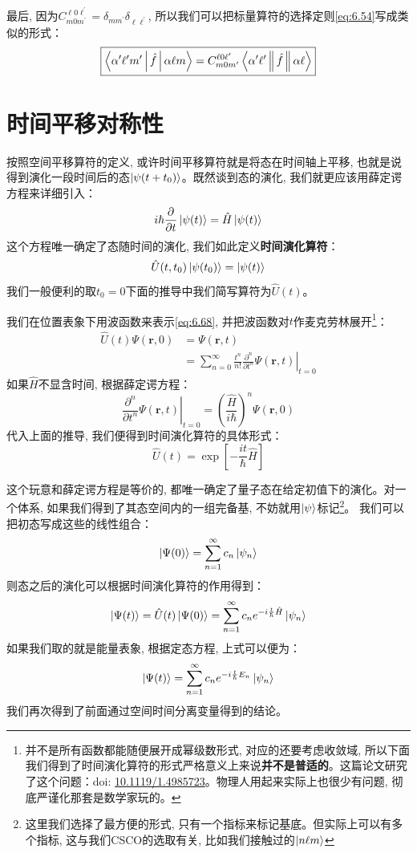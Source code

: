 \documentclass[a4paper,zihao=-4,linespread=1]{ctexrep}
\newcommand{\DOI}[1]{doi: \href{https://doi.org/#1}{#1}} %
\begin{document}
    最后, 因为$C^{\ell 0\ell^\prime}_{m0m^\prime}=\delta_{mm^\prime}\delta_{\ell\ell^\prime}$, 所以我们可以把标量算符的选择定则\ref{eq:6.54}写成类似的形式：
    \begin{equation}
        \boxed{\Braket{\alpha^\prime\ell^\prime m^\prime|\hat{f}|\alpha \ell m}=C^{\ell 0\ell^\prime}_{m0m^\prime}\Braket{\alpha^\prime \ell^\prime \|\hat{f}\|\alpha\ell }}
    \end{equation}

    \section{时间平移对称性}
    按照空间平移算符的定义, 或许时间平移算符就是将态在时间轴上平移, 也就是说得到演化一段时间后的态$\ket{\psi(t+t_0)}$。既然谈到态的演化, 我们就更应该用薛定谔方程来详细引入：
    \[i\hbar\frac{\partial}{\partial t}\ket{\psi(t)}=\hat{H}\ket{\psi(t)}\]
    这个方程唯一确定了态随时间的演化, 我们如此定义\textbf{时间演化算符}：
    \begin{equation}
        \label{eq:6.68}
        \hat{U}(t,t_0)\ket{\psi(t_0)}=\ket{\psi(t)}
    \end{equation}
    我们一般便利的取$t_0=0$下面的推导中我们简写算符为$\hat{U}(t)$。

    我们在位置表象下用波函数来表示\ref{eq:6.68}, 并把波函数对$t$作麦克劳林展开\footnote{并不是所有函数都能随便展开成幂级数形式, 对应的还要考虑收敛域, 所以下面我们得到了时间演化算符的形式严格意义上来说\textbf{并不是普适的}。这篇论文研究了这个问题：\DOI{10.1119/1.4985723}。物理人用起来实际上也很少有问题, 彻底严谨化那套是数学家玩的。}：
    \begin{align*}
        \hat{U}(t)\Psi(\mathbf{r},0)&=\Psi(\mathbf{r},t)\\
        &=\sum_{n=0}^\infty \frac{t^n}{n!}\left.\frac{\partial^{n}}{\partial t^{n}} \Psi(\mathbf{r}, t)\right|_{t=0}
    \end{align*}
    如果$\hat{H}$不显含时间, 根据薛定谔方程：
    \begin{equation}
        \left.\frac{\partial^{n}}{\partial t^{n}} \Psi(\mathbf{r}, t)\right|_{t=0}=\left(\frac{\hat{H}}{i\hbar}\right)^n\Psi(\mathbf{r},0)
    \end{equation}
    代入上面的推导, 我们便得到时间演化算符的具体形式：
    \begin{equation}
        \label{eq:6.70}
        \boxed{\hat{U}(t)=\exp \left[-\frac{i t}{\hbar} \hat{H}\right]}
    \end{equation}
    
    这个玩意和薛定谔方程是等价的, 都唯一确定了量子态在给定初值下的演化。对一个体系, 如果我们得到了其态空间内的一组完备基, 不妨就用$\ket{\psi}$标记\footnote{这里我们选择了最方便的形式, 只有一个指标来标记基底。但实际上可以有多个指标, 这与我们CSCO的选取有关, 比如我们接触过的$\ket{n\ell m}$}。
    我们可以把初态写成这些的线性组合：
    \[\ket{\Psi(0)}=\sum_{n=1}^{\infty}c_n\ket{\psi_n}\]
    则态之后的演化可以根据时间演化算符的作用得到：
    \[\ket{\Psi(t)}=\hat{U}(t)\ket{\Psi(0)}=\sum_{n=1}^{\infty}c_ne^{-i\frac{t}{\hbar}\hat{H}}\ket{\psi_n}\]
    如果我们取的就是能量表象, 根据定态方程, 上式可以便为：
    \[\ket{\Psi(t)}=\sum_{n=1}^{\infty}c_ne^{-i\frac{t}{\hbar}E_n}\ket{\psi_n}\]
    我们再次得到了前面通过空间时间分离变量得到的结论。
    
\end{document}
